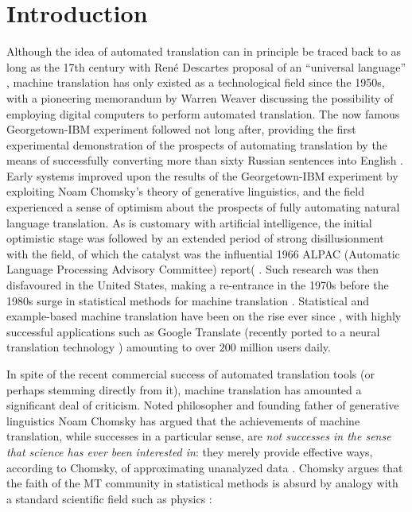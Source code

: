 \documentclass[fleqn,10pt]{article}
\begin{document}
\section{Introduction}

Although the idea of automated translation can in principle be traced back to as long as the 17th century with Ren\'{e} Descartes proposal of an ``universal language'' \citep{dascal1982universal}, machine translation has only existed as a technological field since the 1950s, with a pioneering memorandum by  Warren Weaver \citep{locke1955machine,weaver1955translation} discussing the possibility of employing digital computers to perform automated translation. The now famous Georgetown-IBM experiment followed not long after, providing the first experimental demonstration of the prospects of automating translation by the means of successfully converting more than sixty Russian sentences into English \citep{gordin2015scientific}. Early systems improved upon the results of the Georgetown-IBM experiment by exploiting Noam Chomsky's theory of generative linguistics, and the field experienced a sense of optimism about the prospects of fully automating natural language translation. As is customary with artificial intelligence, the initial optimistic stage was followed by an extended period of strong disillusionment with the field, of which the catalyst was the influential 1966 ALPAC (Automatic Language Processing Advisory Committee) report( \citep{hutchins1986machine}. 
Such research was then disfavoured in the United States, making a re-entrance in the 1970s before the 1980s surge in statistical methods for machine translation \citep{koehn2009statistical,Moses2007}. Statistical and example-based machine translation have been on the rise ever since \citep{Bahdanau2014,carl2003recent,Firat2017}, with highly successful applications such as Google Translate (recently ported to a neural translation technology \citep{wu2016google}) amounting to over $200$ million users daily.

In spite of the recent commercial success of automated translation tools (or perhaps stemming directly from it), machine translation has amounted a significant deal of criticism. Noted philosopher and founding father of generative linguistics Noam Chomsky has argued that the achievements of machine translation, while successes in a particular sense, are \emph{not successes in the sense that science has ever been interested in}: they merely provide effective ways, according to Chomsky, of approximating unanalyzed data \citep{Chomsky2011,norvig2017chomsky}. Chomsky argues that the faith of the MT community in statistical methods is absurd by analogy with a standard scientific field such as physics \citep{Chomsky2011}:
\end{document}
